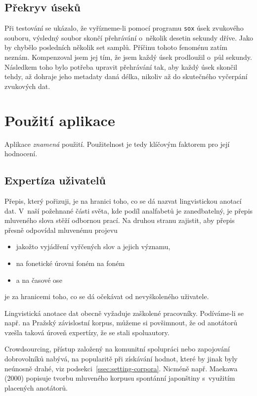 \subsection{Překryv úseků}

Při testování se ukázalo, že vyřízneme-li pomocí programu \texttt{sox} úsek
zvukového souboru, výsledný soubor skončí přehrávání o~několik desetin sekundy
dříve. Jako by chybělo posledních několik set samplů. Příčinu tohoto fenoménu
zatím neznám. Kompenzoval jsem jej tím, že jsem každý úsek prodloužil o~půl
sekundy. Následkem toho bylo potřeba upravit přehrávání tak, aby každý úsek
skončil tehdy, až dohraje jeho metadaty daná délka, nikoliv až do skutečného
vyčerpání zvukových dat.


\section{Použití aplikace}

Aplikace {\em znamená} použití. Použitelnost je tedy klíčovým faktorem pro její hodnocení.

\subsection{Expertíza uživatelů}

Přepis, který pořizuji, je na hranici toho, co se dá nazvat lingvistickou
anotací dat. V~naší požehnané části světa, kde podíl analfabetů je zanedbatelný,
je přepis mluveného slova stěží odbornou prací. Na druhou stranu zajistit, aby
přepis přesně odpovídal mluvenému projevu
\begin{itemize}
\item{jakožto vyjádření vyřčených slov a jejich významu,}
\item{na fonetické úrovni foném na foném}
\item{a na časové ose}
\end{itemize}
je za hranicemi toho, co se dá očekávat od nevyškoleného uživatele.

Lingvistická anotace dat obecně vyžaduje zaškolené pracovníky. Podíváme-li se
např. na Pražský závislostní korpus, můžeme si povšimnout, že od anotátorů
vzešla taková úroveň expertízy, že se stali spoluautory\cite{hajivc2005complex}.

Crowdsourcing, přístup založený na komunitní spolupráci nebo zapojování
dobrovolníků nabývá, na popularitě při získávání hodnot, které by jinak byly
neúnosně drahé, viz podsekci~\ref{ssec:setting-corpora}. Nicméně např. Maekawa (2000)\cite{maekawa2000spontaneous} popisuje tvorbu
mluveného korpusu spontánní japonštiny s~využitím placených anotátorů.

